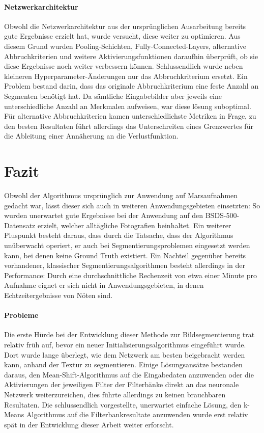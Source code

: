 \paragraph{Netzwerkarchitektur} Obwohl die Netzwerkarchitektur aus der ursprünglichen Ausarbeitung \cite{kanezaki_18} bereits gute Ergebnisse erzielt hat, wurde versucht, diese weiter zu optimieren. Aus diesem Grund wurden Pooling-Schichten, Fully-Connected-Layers, alternative Abbruchkriterien und weitere Aktivierungsfunktionen daraufhin überprüft, ob sie diese Ergebnisse noch weiter verbessern können. Schlussendlich wurde neben kleineren Hyperparameter-Änderungen nur das Abbruchkriterium ersetzt. Ein Problem bestand darin, dass das originale Abbruchkriterium eine feste Anzahl an Segmenten benötigt hat. Da sämtliche Eingabebilder aber jeweils eine unterschiedliche Anzahl an Merkmalen aufweisen, war diese lösung suboptimal. Für alternative Abbruchkriterien kamen unterschiedlichste Metriken in Frage, zu den besten Resultaten führt allerdings das Unterschreiten eines Grenzwertes für die Ableitung einer Annäherung an die Verlustfunktion.

\section{Fazit}

Obwohl der Algorithmus ursprünglich zur Anwendung auf Marsaufnahmen gedacht war, lässt dieser sich auch in weiteren Anwendungsgebieten einsetzten: So wurden \bspw unerwartet gute Ergebnisse bei der Anwendung auf den BSDS-500-Datensatz \cite{bsd500} erzielt, welcher alltägliche Fotografien beinhaltet. Ein weiterer Pluspunkt besteht daraus, dass durch die Tatsache, dass der Algorithmus unüberwacht operiert, er auch bei Segmentierungsproblemen eingesetzt werden kann, bei denen keine Ground Truth existiert. Ein Nachteil gegenüber bereits vorhandener, klassischer Segmentierungsalgorithmen besteht allerdings in der Performance: Durch eine durchschnittliche Rechenzeit von etwa einer Minute pro Aufnahme eignet er sich nicht in Anwendungsgebieten, in denen Echtzeitergebnisse von Nöten sind.

\paragraph{Probleme} Die erste Hürde bei der Entwicklung dieser Methode zur Bildsegmentierung trat relativ früh auf, bevor ein neuer Initialisierungsalgorithmus eingeführt wurde. Dort wurde lange überlegt, wie dem Netzwerk am besten beigebracht werden kann, anhand der Textur zu segmentieren. Einige Lösungsansätze bestanden daraus, den Mean-Shift-Algorithmus auf die Eingabedaten anzuwenden oder die Aktivierungen der jeweiligen Filter der Filterbänke direkt an das neuronale Netzwerk weiterzureichen, dies führte allerdings zu keinen brauchbaren Resultaten. Die schlussendlich vorgestellte, unerwartet einfache Lösung, den k-Means Algorithmus auf die Filterbankresultate anzuwenden wurde erst relativ spät in der Entwicklung dieser Arbeit weiter erforscht.

